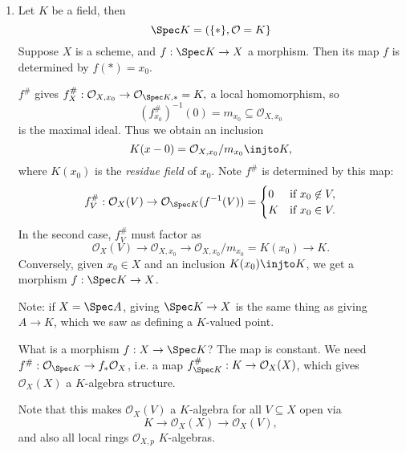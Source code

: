 \documentclass[12pt]{article}
\begin{document}
\begin{exbox}
	\begin{enumerate}
		\item Let $K$ be a field, then
			\[
			\Spec K = (\{\ast\}, \mathcal{O} = K\}
			\]
			Suppose $X$ is a scheme, and $f : \Spec K \to X$ a morphism. Then its map $f$ is determined by $f(\ast) = x_0$.

			$f^{\#}$ gives $f^{\#}_X : \mathcal{O}_{X, x_0} \to \mathcal{O}_{\Spec K, \ast} = K,$ a local homomorphism, so
			\[
				(f^{\#}_{x_0})^{-1}(0) = m_{x_0} \subseteq \mathcal{O}_{X, x_0}
			\]
			is the maximal ideal. Thus we obtain an inclusion
			\[
			K(x-0) = \mathcal{O}_{X, x_0} / m_{x_0} \injto K,
			\]
			where $K(x_0)$ is the \emph{residue field} of $x_0$. Note $f^{\#}$ is determined by this map:
			\[
			f^{\#}_V : \mathcal{O}_{X}(V) \to \mathcal{O}_{\Spec K} (f^{-1}(V)) =
			\begin{cases}
				0 & \text{if } x_0 \not \in V, \\
				K &\text{if } x_0 \in V.
			\end{cases}
			\]
			In the second case, $f_V^{\#}$ must factor as
			\[
			\mathcal{O}_{X}(V) \to \mathcal{O}_{X, x_0} \to \mathcal{O}_{X, x_0} / m_{x_0} = K(x_0) \to K.
			\]
			Conversely, given $x_0 \in X$ and an inclusion $K(x_0) \injto K$, we get a morphism $f : \Spec K \to X$.

			Note: if $X = \Spec A$, giving $\Spec K \to X$ is the same thing as giving $A \to K$, which we saw as defining a $K$-valued point.

			What is a morphism $f : X \to \Spec K$? The map is constant. We need $f^{\#} : \mathcal{O}_{\Spec K} \to f_\ast \mathcal{O}_X$, i.e. a map $f^{\#}_{\Spec K} : K \to \mathcal{O}_X(X)$, which gives $\mathcal{O}_X(X)$ a $K$-algebra structure.

			Note that this makes $\mathcal{O}_{X}(V)$ a $K$-algebra for all $V \subseteq X$ open via
			\[
			K \to \mathcal{O}_X(X) \to \mathcal{O}_X(V),
			\]
			and also all local rings $\mathcal{O}_{X, p}$ $K$-algebras.
	\end{enumerate}
\end{exbox}



\newpage

\printindex
\end{document}
